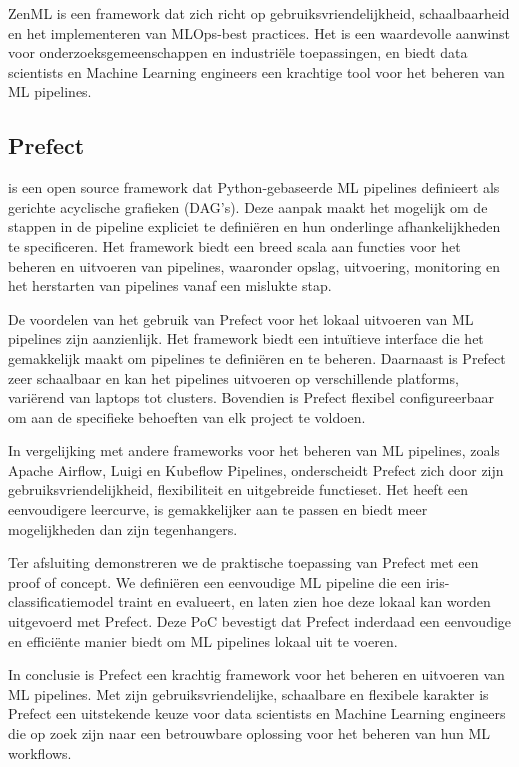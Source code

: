 ZenML is een framework dat zich richt op gebruiksvriendelijkheid, schaalbaarheid en het implementeren van MLOps-best practices. Het is een waardevolle aanwinst voor onderzoeksgemeenschappen en industriële toepassingen, en biedt data scientists en Machine Learning engineers een krachtige tool voor het beheren van ML pipelines.


\subsection{Prefect}

\textcite{Prefect2024} is een open source framework dat Python-gebaseerde ML pipelines definieert als gerichte acyclische grafieken (DAG's). Deze aanpak maakt het mogelijk om de stappen in de pipeline expliciet te definiëren en hun onderlinge afhankelijkheden te specificeren. Het framework biedt een breed scala aan functies voor het beheren en uitvoeren van pipelines, waaronder opslag, uitvoering, monitoring en het herstarten van pipelines vanaf een mislukte stap.

De voordelen van het gebruik van Prefect voor het lokaal uitvoeren van ML pipelines zijn aanzienlijk. Het framework biedt een intuïtieve interface die het gemakkelijk maakt om pipelines te definiëren en te beheren. Daarnaast is Prefect zeer schaalbaar en kan het pipelines uitvoeren op verschillende platforms, variërend van laptops tot clusters. Bovendien is Prefect flexibel configureerbaar om aan de specifieke behoeften van elk project te voldoen.

In vergelijking met andere frameworks voor het beheren van ML pipelines, zoals Apache Airflow, Luigi en Kubeflow Pipelines, onderscheidt Prefect zich door zijn gebruiksvriendelijkheid, flexibiliteit en uitgebreide functieset. Het heeft een eenvoudigere leercurve, is gemakkelijker aan te passen en biedt meer mogelijkheden dan zijn tegenhangers.

Ter afsluiting demonstreren we de praktische toepassing van Prefect met een proof of concept. We definiëren een eenvoudige ML pipeline die een iris-classificatiemodel traint en evalueert, en laten zien hoe deze lokaal kan worden uitgevoerd met Prefect. Deze PoC bevestigt dat Prefect inderdaad een eenvoudige en efficiënte manier biedt om ML pipelines lokaal uit te voeren.

In conclusie is Prefect een krachtig framework voor het beheren en uitvoeren van ML pipelines. Met zijn gebruiksvriendelijke, schaalbare en flexibele karakter is Prefect een uitstekende keuze voor data scientists en Machine Learning engineers die op zoek zijn naar een betrouwbare oplossing voor het beheren van hun ML workflows.
